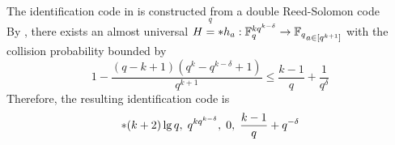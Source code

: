 \begin{example}
    The identification code in \cite{derebeyoglu} is constructed from a double Reed-Solomon code
\begin{equation}
    [q^{k+1}, k q^{k- \delta}, (q-k+1)(q^k - q^{k-\delta} +1)]_q
\end{equation}
    By , there exists an almost universal \(H = \set{h_a : \mathbb{F}_q^{kq^{k - \delta}} \to \mathbb{F}_q}_{a \in [q^{k+1}]}\) with the collision probability bounded by 
    \begin{equation}
        1 - \dfrac{(q-k+1)(q^k - q^{k-\delta} +1)}{q^{k+1}} \leq \dfrac{k-1}{q} + \dfrac{1}{q^{\delta}}
    \end{equation}
    Therefore, the resulting identification code is 
    \begin{equation}
        \bracket{(k+2)\lg q,\; q^{kq^{k - \delta}},\; 0 ,\; \dfrac{k-1}{q} + q^{-\delta}}
    \end{equation}
\end{example}

